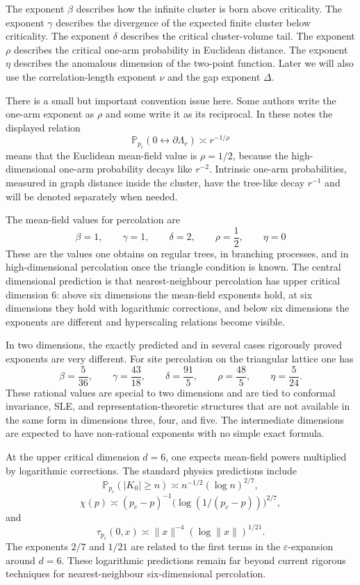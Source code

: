 \documentclass[11pt,reqno]{book}
\numberwithin{equation}{chapter}
\theoremstyle{plain}
\theoremstyle{definition}
\theoremstyle{remark}
\newcommand{\Pc}{\mathbb P_{p_c}}
\newcommand{\eps}{\varepsilon}
\newcommand{\1}{\mathbf 1}
\newcommand{\norm}[1]{\lVert #1\rVert}
\newcommand{\as}{\asymp}
\begin{document}
The exponent $\beta$ describes how the infinite cluster is born above criticality. The exponent $\gamma$ describes the divergence of the expected finite cluster below criticality. The exponent $\delta$ describes the critical cluster-volume tail. The exponent $\rho$ describes the critical one-arm probability in Euclidean distance. The exponent $\eta$ describes the anomalous dimension of the two-point function. Later we will also use the correlation-length exponent $\nu$ and the gap exponent $\Delta$.

There is a small but important convention issue here. Some authors write the one-arm exponent as $\rho$ and some write it as its reciprocal. In these notes the displayed relation
\[
  \Pc(0\leftrightarrow \partial\Lambda_r)\as r^{-1/\rho}
\]
means that the Euclidean mean-field value is $\rho=1/2$, because the high-dimensional one-arm probability decays like $r^{-2}$. Intrinsic one-arm probabilities, measured in graph distance inside the cluster, have the tree-like decay $r^{-1}$ and will be denoted separately when needed.

The mean-field values for percolation are
\[
  \beta=1,\qquad \gamma=1,\qquad \delta=2,\qquad \rho=\frac12,\qquad \eta=0
\]
These are the values one obtains on regular trees, in branching processes, and in high-dimensional percolation once the triangle condition is known. The central dimensional prediction is that nearest-neighbour percolation has upper critical dimension $6$: above six dimensions the mean-field exponents hold, at six dimensions they hold with logarithmic corrections, and below six dimensions the exponents are different and hyperscaling relations become visible.

In two dimensions, the exactly predicted and in several cases rigorously proved exponents are very different. For site percolation on the triangular lattice one has
\[
  \beta=\frac{5}{36},\qquad
  \gamma=\frac{43}{18},\qquad
  \delta=\frac{91}{5},\qquad
  \rho=\frac{48}{5},\qquad
  \eta=\frac{5}{24}.
\]
These rational values are special to two dimensions and are tied to conformal invariance, SLE, and representation-theoretic structures that are not available in the same form in dimensions three, four, and five. The intermediate dimensions are expected to have non-rational exponents with no simple exact formula.

At the upper critical dimension $d=6$, one expects mean-field powers multiplied by logarithmic corrections. The standard physics predictions include
\[
  \Pc(|K_0|\geq n)
  \as
  n^{-1/2}(\log n)^{2/7},
\]
\[
  \chi(p)
  \as
  (p_c-p)^{-1}\bigl(\log(1/(p_c-p))\bigr)^{2/7},
\]
and
\[
  \tau_{p_c}(0,x)
  \as
  \norm{x}^{-4}(\log \norm{x})^{1/21}.
\]
The exponents $2/7$ and $1/21$ are related to the first terms in the $\eps$-expansion around $d=6$. These logarithmic predictions remain far beyond current rigorous techniques for nearest-neighbour six-dimensional percolation.
\end{document}
